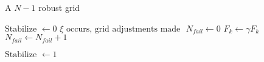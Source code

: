 
\begin{algorithm}
\caption{A $N-1$ robust grid}
\begin{algorithmic}
\STATE $ \mbox{Stabilize } \gets 0 $
\STATE $ \xi \mbox{ occurs, grid adjustments made } $
	\STATE $N_{fail} \gets 0$
				\STATE $ F_k \gets \gamma F_k $
				\STATE $N_{fail} \gets N_{fail} + 1 $
		\ENDIF  
	\ENDFOR
	
				\STATE $ \mbox{Stabilize } \gets 1 $
		\ENDIF


\ENDWHILE

\end{algorithmic}
\end{algorithm}